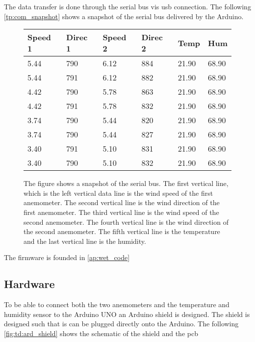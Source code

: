 The data transfer is done through the serial bus vis \gls{usb} connection. The following \autoref{tp:com_snapshot} shows a snapshot of the serial bus delivered by the Arduino.


\begin{figure}[H]
\centering
      \captionsetup{width=0.57\linewidth}
      \footnotesize
\begin{tabular}{llllll}
Speed 1 & Direc 1 & Speed 2 & Direc 2 & Temp  & Hum   \\ \hline
5.44    & 790     & 6.12    & 884     & 21.90 & 68.90 \\
5.44    & 791     & 6.12    & 882     & 21.90 & 68.90 \\
4.42    & 790     & 5.78    & 863     & 21.90 & 68.90 \\
4.42    & 791     & 5.78    & 832     & 21.90 & 68.90 \\
3.74    & 790     & 5.44    & 820     & 21.90 & 68.90 \\
3.74    & 790     & 5.44    & 827     & 21.90 & 68.90 \\
3.40    & 791     & 5.10    & 831     & 21.90 & 68.90 \\
3.40    & 790     & 5.10    & 832     & 21.90 & 68.90
\end{tabular}
\caption{The figure shows a snapshot of the serial bus. The first vertical line, which is the left vertical data line is the wind speed of the first anemometer.  The second vertical line is the wind direction of the first anemometer. The third vertical line is the wind speed of the second anemometer.  The fourth vertical line is the wind direction of the second anemometer. The fifth vertical line is the temperature and the last vertical line is the humidity.}
\label{tp:com_snapshot}
\end{figure}%


The firmware is founded in \autoref{ap:wet_code}


\subsection{Hardware}

To be able to connect both the two anemometers and the temperature and humidity sensor to the Arduino UNO an Arduino shield is designed. The shield is designed such that is can be plugged directly onto the Arduino. The following \autoref{fig:td:ard_shield} shows the schematic of the shield and the \gls{pcb}




